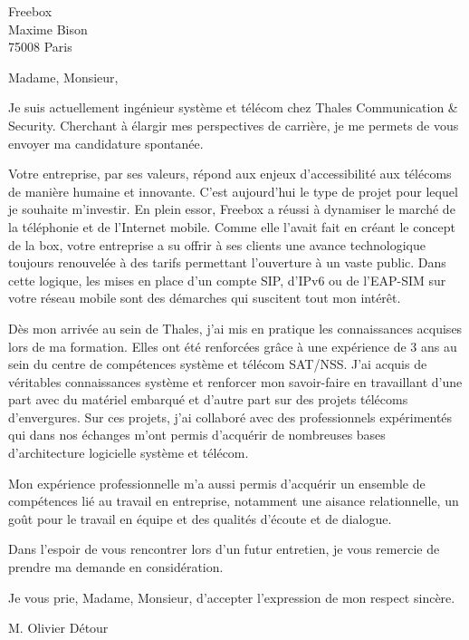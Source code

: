 \documentclass[12pt]{letter}
\def\companyname{Freebox}
\def\companyservice{Maxime Bison}
\def\companyzip{75008}
\def\companycity{Paris}
\begin{document}
  \begin{letter}{\companyname \\ \companyservice \\ \companyzip{} \companycity}
    \opening{Madame, Monsieur,}

      \indent Je suis actuellement ingénieur système et télécom chez Thales Communication
      \& Security. Cherchant \`a élargir mes perspectives de carrière, je me permets de vous
      envoyer ma candidature spontanée.
      
      \indent Votre entreprise, par ses valeurs, répond aux enjeux d'accessibilité aux
      télécoms de manière humaine et innovante. C'est aujourd'hui le type de projet pour
      lequel je souhaite m'investir. En plein essor, Freebox a réussi à dynamiser le marché
      de la téléphonie et de l'Internet mobile. Comme elle l'avait fait en créant le concept
      de la box, votre entreprise a su offrir à ses clients une avance technologique toujours
      renouvelée à des tarifs permettant l'ouverture à un vaste public. Dans cette logique,
      les mises en place d'un compte SIP, d'IPv6 ou de l'EAP-SIM sur votre réseau mobile
      sont des démarches qui suscitent tout mon intérêt.

      \indent Dès mon arrivée au sein de Thales, j'ai mis en pratique les connaissances
      acquises lors de ma formation. Elles ont été renforcées grâce \`a une expérience
      de 3 ans au sein du centre de compétences système et télécom SAT/NSS.  J'ai acquis
      de véritables connaissances système et renforcer mon savoir-faire en travaillant
      d'une part avec du matériel embarqué et d'autre part sur des projets télécoms
      d'envergures. Sur ces projets, j'ai collaboré avec des professionnels expérimentés
      qui dans nos échanges m'ont permis d'acquérir de nombreuses bases d'architecture
      logicielle système et télécom.

      \indent Mon expérience professionnelle m'a aussi permis d'acquérir un ensemble de
      compétences lié au travail en entreprise, notamment une aisance relationnelle, un
      goût pour le travail en équipe et des qualités d'écoute et de dialogue.

      \indent Dans l'espoir de vous rencontrer lors d'un futur entretien, je vous remercie
      de prendre ma demande en considération.
      
      \indent Je vous prie, Madame, Monsieur, d'accepter l'expression de mon respect sincère.


    \closing{M. Olivier D\'etour}

  \end{letter}
\end{document}
